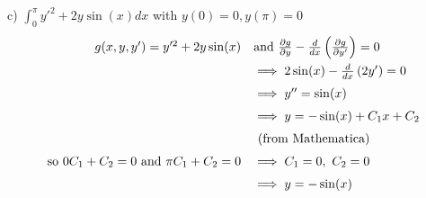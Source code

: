 \documentclass[11pt]{article}
\begin{document}
c) $\int_0^\pi y'^2+2y\sin(x) dx$ with $y(0)=0,y(\pi)=0$
\[
\def\arraystretch{1.5}
\begin{array}{rl}
    g(x,y,y')=y'^2+2y\sin(x) &\textrm{and}\ 
    \frac{\partial g}{\partial y}-\frac{d}{dx}\left(\frac{\partial g}{\partial y'}\right)=0 \\
    &\implies 2\sin(x)-\frac{d}{dx}\left(2y'\right)=0 \\
    &\implies y''=\sin(x) \\
    &\implies y=-\sin(x)+C_1x+C_2\\
    &\textrm{ (from Mathematica) } \\
    \textrm{so }0C_1+C_2=0\textrm{ and }\pi C_1+C_2=0 &\implies
    C_1=0,\ C_2=0 \\
    &\implies y=-\sin(x)
\end{array}
\]
\end{document}
